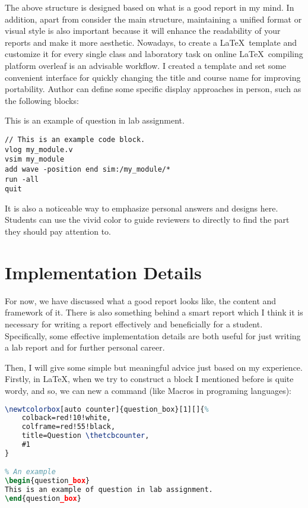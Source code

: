 \documentclass[12pt]{article}
\begin{document}
The above structure is designed based on what is a good report in my mind.
In addition, apart from consider the main structure, maintaining a unified format or visual style is also important because it will enhance the readability of your reports and make it more aesthetic.
Nowadays, to create a \LaTeX \ template and customize it for every single class and laboratory task on online \LaTeX \ compiling platform overleaf is an advisable workflow.
I created a template and set some convenient interface for quickly changing the title and course name for improving portability.
Author can define some specific display approaches in person, such as the following blocks:


\begin{questionbox}
This is an example of question in lab assignment.
\end{questionbox}

\begin{lstlisting}[caption={Example QuestaSim .do File}, label={lst:questasim_example}, language=questasim]
// This is an example code block.
vlog my_module.v
vsim my_module
add wave -position end sim:/my_module/*
run -all
quit
\end{lstlisting}

It is also a noticeable way to emphasize personal answers and designs here.
Students can use the vivid color to guide reviewers to directly to find the part they should pay attention to.

\section{Implementation Details}

For now, we have discussed what a good report looks like, the content and framework of it.
There is also something behind a smart report which I think it is necessary for writing a report effectively and beneficially for a student.
Specifically, some effective implementation details are both useful for just writing a lab report and for further personal career.

Then, I will give some simple but meaningful advice just based on my experience.
Firstly, in \LaTeX , when we try to construct a block I mentioned before is quite wordy, and so, we can new a command (like Macros in programing languages):

\begin{lstlisting}[language=LaTeX,label={lst:LaTeX_block}]
% If we use \newcolorbox to create a category "question_box" rather than copy it every time
\newtcolorbox[auto counter]{question_box}[1][]{%
    colback=red!10!white,
    colframe=red!55!black,
    title=Question \thetcbcounter,
    #1
}

% An example
\begin{question_box}
This is an example of question in lab assignment.
\end{question_box}

\end{lstlisting}
\end{document}
